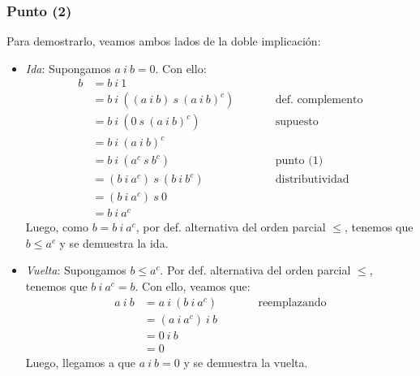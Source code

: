 \documentclass{article}
\begin{document}
\subsubsection*{Punto (2)}
Para demostrarlo, veamos ambos lados de la doble implicación:
\begin{itemize}
  \item \textit{Ida}: Supongamos $a\ i\ b=0$. Con ello:
        \begin{equation*}
          \begin{alignedat}{2}
            b & =b\ i\ 1                                                              \\
              & =b\ i\ ((a\ i\ b)\ s\ (a\ i\ b)^c) &  & \qquad\text{def. complemento} \\
              & =b\ i\ (0\ s\ (a\ i\ b)^c)         &  & \qquad\text{supuesto}         \\
              & =b\ i\ (a\ i\ b)^c                                                    \\
              & =b\ i\ (a^c\ s\ b^c)               &  & \qquad\text{punto (1)}        \\
              & =(b\ i\ a^c)\ s\ (b\ i\ b^c)       &  & \qquad\text{distributividad}  \\
              & =(b\ i\ a^c)\ s\ 0                                                    \\
              & =b\ i\ a^c
          \end{alignedat}
        \end{equation*}
        Luego, como $b=b\ i\ a^c$, por def. alternativa del orden parcial $\leq$, tenemos que $b\leq a^c$ y se demuestra la ida.

  \item \textit{Vuelta}: Supongamos $b\leq a^c$. Por def. alternativa del orden parcial $\leq$, tenemos que $b\ i\ a^c=b$. Con ello, veamos que:
        \begin{equation*}
          \begin{alignedat}{2}
            a\ i\ b & =a\ i\ (b\ i\ a^c) &  & \qquad\text{reemplazando} \\
                    & =(a\ i\ a^c)\ i\ b                                \\
                    & =0\ i\ b                                          \\
                    & =0
          \end{alignedat}
        \end{equation*}
        Luego, llegamos a que $a\ i\ b=0$ y se demuestra la vuelta.
\end{itemize}
\end{document}
